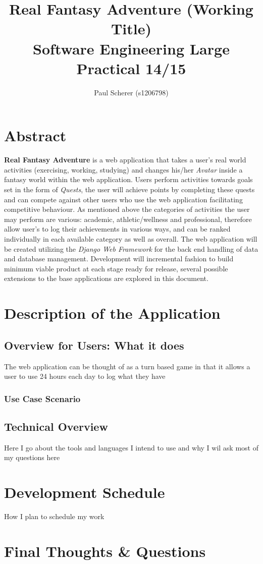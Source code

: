\documentclass[11pt, a4paper]{article}
\begin{document}
\title{Real Fantasy Adventure (Working Title) \\
Software Engineering Large Practical 14/15}
\author{Paul Scherer (s1206798)}
\maketitle
\newpage

\tableofcontents
\newpage


\section{Abstract}
\textbf{Real Fantasy Adventure} is a web application that takes a user's real world activities (exercising, working, studying) and changes his/her \textit{Avatar} inside a fantasy world within the web application. Users perform activities towards goals set in the form of \textit{Quests}, the user will achieve points by completing these quests and can compete against other users who use the web application facilitating competitive behaviour. As mentioned above the categories of activities the user may perform are various: academic, athletic/wellness and professional, therefore allow user's to log their achievements in various ways, and can be ranked individually in each available category as well as overall. The web application will be created utilizing the \textit{Django Web Framework} for the back end handling of data and database management. Development will incremental fashion to build minimum viable product at each stage ready for release, several possible extensions to the base applications are explored in this document.

\section{Description of the Application}
\subsection{Overview for Users: What it does}
The web application can be thought of as a turn based game in that it allows a user to use 24 hours each day to log what they have

\subsubsection{Use Case Scenario}

\subsection{Technical Overview}
Here I go about the tools and languages I intend to use and why I wil ask most of my questions here

\section{Development Schedule}
How I plan to schedule my work

\section{Final Thoughts \& Questions}
\end{document}
